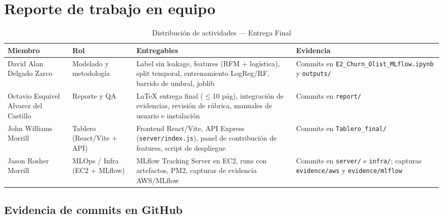 \documentclass[11pt]{article}
\begin{document}
\newpage
\section*{Reporte de trabajo en equipo}


{\small
\setlength{\tabcolsep}{4pt}
\renewcommand{\arraystretch}{2.2}

\begin{table}[H]
\centering
\caption*{Distribución de actividades — Entrega Final}
\begin{tabularx}{\textwidth}{
  >{\RaggedRight\arraybackslash}p{3.8cm}
  >{\RaggedRight\arraybackslash}p{2.8cm}
  >{\RaggedRight\arraybackslash}X
  >{\RaggedRight\arraybackslash}p{3.0cm}}
\toprule
\textbf{Miembro} & \textbf{Rol} & \textbf{Entregables} & \textbf{Evidencia} \\
\midrule
David Alan Delgado Zarco &
Modelado y metodología &
Label sin leakage, features (RFM + logística), split temporal, entrenamiento
LogReg/RF, barrido de umbral, joblib &
Commits en \texttt{E2\_Churn\_Olist\_MLflow.ipynb} y \texttt{outputs/} \\

Octavio Esquivel Alvarez del Castillo &
Reporte y QA &
LaTeX entrega final ($\leq$10 pág), integración de evidencias, revisión de
rúbrica, manuales de usuario e instalación &
Commits en \texttt{report/} \\

John Williams Morrill &
Tablero (React/Vite + API) &
Frontend React/Vite, API Express (\texttt{server/index.js}), panel de
contribución de features, script de despliegue &
Commits en \texttt{Tablero\_final/} \\

Jason Rosher Morrill &
MLOps / Infra (EC2 + MLflow) &
MLflow Tracking Server en EC2, runs con artefactos, PM2, capturas de
evidencia AWS/MLflow &
Commits en \texttt{server/} e \texttt{infra/}; capturas \texttt{evidence/aws}
y \texttt{evidence/mlflow} \\
\bottomrule
\end{tabularx}
\end{table}
}

\subsection*{Evidencia de commits en GitHub}
\end{document}

